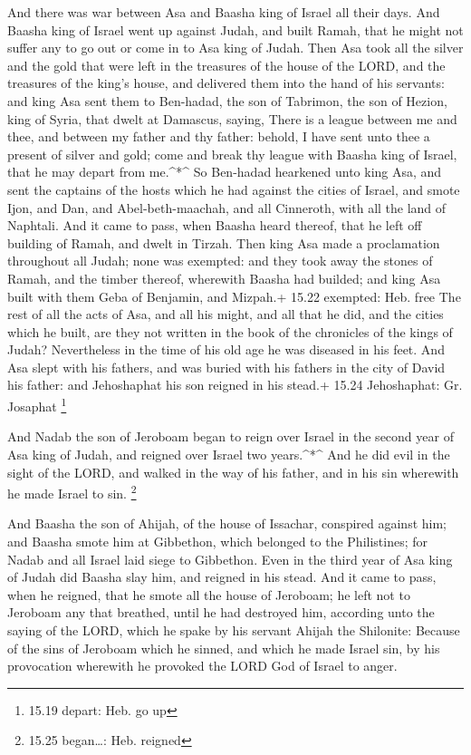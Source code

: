  And there was war between Asa and Baasha king of Israel
all their days.  And Baasha king of Israel went up against
Judah, and built Ramah, that he might not suffer any to go out or come
in to Asa king of Judah.  Then Asa took all the silver and
the gold that were left in the treasures of the house of the LORD, and
the treasures of the king's house, and delivered them into the hand of
his servants: and king Asa sent them to Ben-hadad, the son of Tabrimon,
the son of Hezion, king of Syria, that dwelt at Damascus, saying,
 There is a league between me and thee, and between my
father and thy father: behold, I have sent unto thee a present of silver
and gold; come and break thy league with Baasha king of Israel, that he
may depart from me.\^{}*\^{}  So Ben-hadad hearkened unto
king Asa, and sent the captains of the hosts which he had against the
cities of Israel, and smote Ijon, and Dan, and Abel-beth-maachah, and
all Cinneroth, with all the land of Naphtali.  And it came
to pass, when Baasha heard thereof, that he left off building of Ramah,
and dwelt in Tirzah.  Then king Asa made a proclamation
throughout all Judah; none was exempted: and they took away the stones
of Ramah, and the timber thereof, wherewith Baasha had builded; and king
Asa built with them Geba of Benjamin, and Mizpah.+ 15.22 exempted: Heb.
free  The rest of all the acts of Asa, and all his might,
and all that he did, and the cities which he built, are they not written
in the book of the chronicles of the kings of Judah? Nevertheless in the
time of his old age he was diseased in his feet.  And Asa
slept with his fathers, and was buried with his fathers in the city of
David his father: and Jehoshaphat his son reigned in his stead.+ 15.24
Jehoshaphat: Gr. Josaphat \footnote{15.19 depart: Heb. go up}

 And Nadab the son of Jeroboam began to reign over Israel
in the second year of Asa king of Judah, and reigned over Israel two
years.\^{}*\^{}  And he did evil in the sight of the LORD,
and walked in the way of his father, and in his sin wherewith he made
Israel to sin. \footnote{15.25 began\ldots: Heb. reigned}

 And Baasha the son of Ahijah, of the house of Issachar,
conspired against him; and Baasha smote him at Gibbethon, which belonged
to the Philistines; for Nadab and all Israel laid siege to Gibbethon.
 Even in the third year of Asa king of Judah did Baasha
slay him, and reigned in his stead.  And it came to pass,
when he reigned, that he smote all the house of Jeroboam; he left not to
Jeroboam any that breathed, until he had destroyed him, according unto
the saying of the LORD, which he spake by his servant Ahijah the
Shilonite:  Because of the sins of Jeroboam which he
sinned, and which he made Israel sin, by his provocation wherewith he
provoked the LORD God of Israel to anger.

